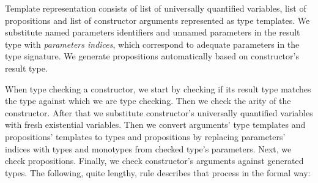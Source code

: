 \documentclass[declaration,shortabstract,english]{iithesis}
\begin{document}
Template representation consists of list of universally quantified variables, list of propositions and list of constructor
arguments represented as type templates. We substitute named parameters identifiers and unnamed parameters in the result type with
\textit{parameters indices}, which correspond to adequate parameters in the type signature.
We generate propositions automatically based on constructor's result type.

When type checking a constructor, we start by checking if its result type matches the type against which we are type checking.
Then we check the arity of the constructor.
After that we substitute constructor's universally quantified variables with fresh existential variables.
Then we convert arguments' type templates and propositions' templates to types and propositions
by replacing parameters' indices with types and monotypes from checked type's parameters.
Next, we check propositions. Finally, we check constructor's arguments against generated types.
The following, quite lengthy, rule describes that process in the formal way:
\end{document}

